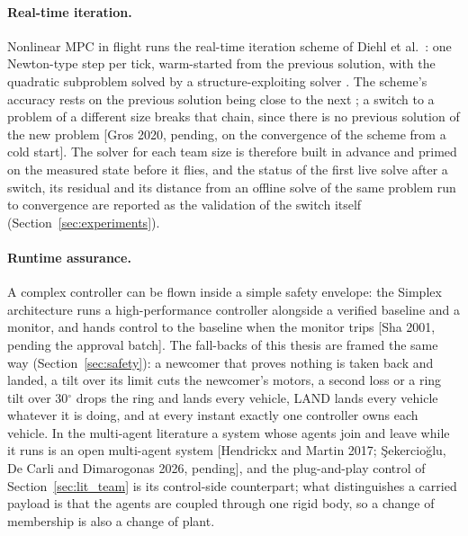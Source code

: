 \paragraph{Real-time iteration.} Nonlinear MPC in flight runs the real-time iteration scheme of Diehl et al.\
\cite{diehl2002rti}: one Newton-type step per tick, warm-started from the previous solution, with the quadratic
subproblem solved by a structure-exploiting solver \cite{frison2020hpipm, verschueren2022acados}. The scheme's
accuracy rests on the previous solution being close to the next \cite{rawlings2017mpc}; a switch to a problem of a
different size breaks that chain, since there is no previous solution of the new problem [Gros 2020, pending, on
the convergence of the scheme from a cold start]. The solver for each team size is therefore built in advance and
primed on the measured state before it flies, and the status of the first live solve after a switch, its
residual and its distance from an offline solve of the same problem run to convergence are reported as the
validation of the switch itself (Section~\ref{sec:experiments}).

\paragraph{Runtime assurance.} A complex controller can be flown inside a simple safety envelope: the Simplex
architecture runs a high-performance controller alongside a verified baseline and a monitor, and hands control to
the baseline when the monitor trips [Sha 2001, pending the approval batch]. The fall-backs of this thesis are
framed the same way (Section~\ref{sec:safety}): a newcomer that proves nothing is taken back and landed, a tilt
over its limit cuts the newcomer's motors, a second loss or a ring tilt over 30$^\circ$ drops the ring and lands
every vehicle, LAND lands every vehicle whatever it is doing, and at every instant exactly one controller owns
each vehicle. In the multi-agent literature a system whose agents join and leave while it runs is an open
multi-agent system [Hendrickx and Martin 2017; \c{S}ekercio\u{g}lu, De Carli and Dimarogonas 2026, pending], and
the plug-and-play control of Section~\ref{sec:lit_team} is its control-side counterpart; what distinguishes a
carried payload is that the agents are coupled through one rigid body, so a change of membership is also a change
of plant.
